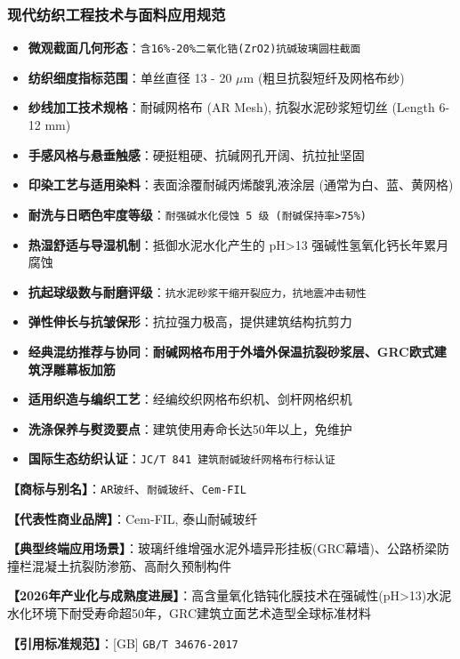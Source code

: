 \documentclass[11pt,openright,twoside,UTF8]{ctexbook}
\begin{document}
\subsubsection*{现代纺织工程技术与面料应用规范}
\begin{itemize} \setlength{\itemsep}{2pt}
    \item \textbf{微观截面几何形态}：\texttt{含16\%-20\%二氧化锆(ZrO2)抗碱玻璃圆柱截面}
    \item \textbf{纺织细度指标范围}：单丝直径 13 - 20 $\mu$m (粗旦抗裂短纤及网格布纱)
    \item \textbf{纱线加工技术规格}：耐碱网格布 (AR Mesh), 抗裂水泥砂浆短切丝 (Length 6-12 mm)
    \item \textbf{手感风格与悬垂触感}：硬挺粗硬、抗碱网孔开阔、抗拉扯坚固
    \item \textbf{印染工艺与适用染料}：表面涂覆耐碱丙烯酸乳液涂层 (通常为白、蓝、黄网格)
    \item \textbf{耐洗与日晒色牢度等级}：\texttt{耐强碱水化侵蚀 5 级 (耐碱保持率\textgreater{}75\%)}
    \item \textbf{热湿舒适与导湿机制}：抵御水泥水化产生的 pH\textgreater{}13 强碱性氢氧化钙长年累月腐蚀
    \item \textbf{抗起球级数与耐磨评级}：\texttt{抗水泥砂浆干缩开裂应力，抗地震冲击韧性}
    \item \textbf{弹性伸长与抗皱保形}：抗拉强力极高，提供建筑结构抗剪力
    \item \textbf{经典混纺推荐与协同}：\textbf{耐碱网格布用于外墙外保温抗裂砂浆层、GRC欧式建筑浮雕幕板加筋}
    \item \textbf{适用织造与编织工艺}：经编绞织网格布织机、剑杆网格织机
    \item \textbf{洗涤保养与熨烫要点}：建筑使用寿命长达50年以上，免维护
    \item \textbf{国际生态纺织认证}：\texttt{JC/T 841 建筑耐碱玻纤网格布行标认证}
\end{itemize}
\vspace{0.2cm}

\noindent\textbf{【商标与别名】}：\texttt{AR玻纤}、\texttt{耐碱玻纤}、\texttt{Cem-FIL}\par
\noindent\textbf{【代表性商业品牌】}：Cem-FIL, 泰山耐碱玻纤\par
\noindent\textbf{【典型终端应用场景】}：玻璃纤维增强水泥外墙异形挂板(GRC幕墙)、公路桥梁防撞栏混凝土抗裂防渗筋、高耐久预制构件\par
\noindent\textbf{【2026年产业化与成熟度进展】}：高含量氧化锆钝化膜技术在强碱性(pH\textgreater{}13)水泥水化环境下耐受寿命超50年，GRC建筑立面艺术造型全球标准材料\par
\noindent\textbf{【引用标准规范】}：[GB] \texttt{GB/T 34676-2017}\par
\vspace{0.5cm}
\end{document}
